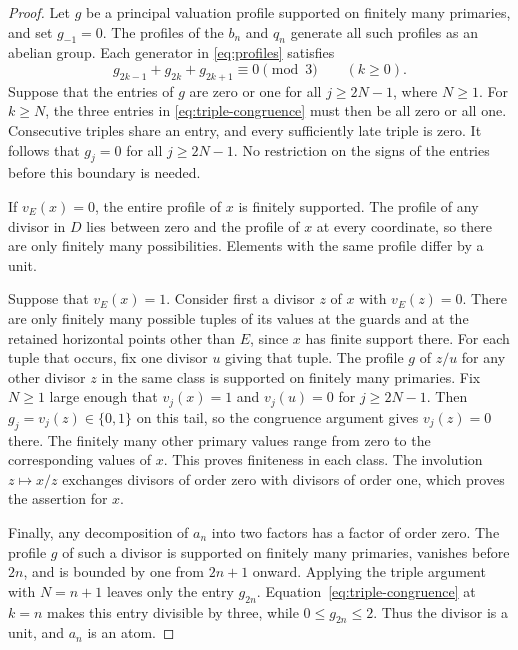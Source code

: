 \begin{proof}
    Let $g$ be a principal valuation profile supported on finitely many primaries, and set $g_{-1} = 0$.
    The profiles of the $b_n$ and $q_n$ generate all such profiles as an abelian group.
    Each generator in \eqref{eq:profiles} satisfies
    \begin{equation}
        g_{2k - 1} + g_{2k} + g_{2k + 1} \equiv 0 \pmod{3}
        \qquad (k \ge 0).
        \label{eq:triple-congruence}
    \end{equation}
    Suppose that the entries of $g$ are zero or one for all $j \ge 2N - 1$, where $N \ge 1$.
    For $k \ge N$, the three entries in \eqref{eq:triple-congruence} must then be all zero or all one.
    Consecutive triples share an entry, and every sufficiently late triple is zero.
    It follows that $g_j = 0$ for all $j \ge 2N - 1$.
    No restriction on the signs of the entries before this boundary is needed.

    If $v_E(x) = 0$, the entire profile of $x$ is finitely supported.
    The profile of any divisor in $D$ lies between zero and the profile of $x$ at every coordinate, so there are only finitely many possibilities.
    Elements with the same profile differ by a unit.

    Suppose that $v_E(x) = 1$.
    Consider first a divisor $z$ of $x$ with $v_E(z) = 0$.
    There are only finitely many possible tuples of its values at the guards and at the retained horizontal points other than $E$, since $x$ has finite support there.
    For each tuple that occurs, fix one divisor $u$ giving that tuple.
    The profile $g$ of $z/u$ for any other divisor $z$ in the same class is supported on finitely many primaries.
    Fix $N \ge 1$ large enough that $v_j(x) = 1$ and $v_j(u) = 0$ for $j \ge 2N - 1$.
    Then $g_j = v_j(z) \in \{0, 1\}$ on this tail, so the congruence argument gives $v_j(z) = 0$ there.
    The finitely many other primary values range from zero to the corresponding values of $x$.
    This proves finiteness in each class.
    The involution $z \mapsto x/z$ exchanges divisors of order zero with divisors of order one, which proves the assertion for $x$.

    Finally, any decomposition of $a_n$ into two factors has a factor of order zero.
    The profile $g$ of such a divisor is supported on finitely many primaries, vanishes before $2n$, and is bounded by one from $2n + 1$ onward.
    Applying the triple argument with $N = n + 1$ leaves only the entry $g_{2n}$.
    Equation~\eqref{eq:triple-congruence} at $k = n$ makes this entry divisible by three, while $0 \le g_{2n} \le 2$.
    Thus the divisor is a unit, and $a_n$ is an atom.
\end{proof}

